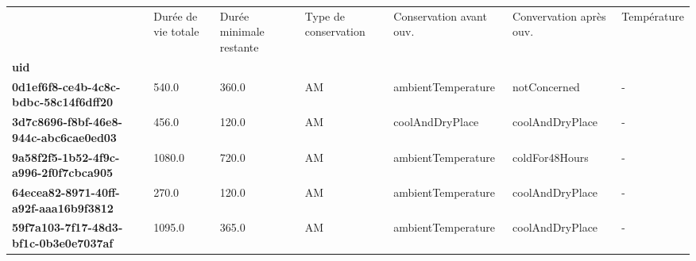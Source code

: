 \begin{tabularx}{\linewidth}{lXXXXXX}
\toprule
{} &  Durée de vie totale &  Durée minimale restante & Type de conservation & Conservation avant ouv. & Convervation après ouv. & Température \\
\textbf{uid                                 } &                      &                          &                      &                         &                         &             \\
\midrule
\textbf{0d1ef6f8-ce4b-4c8c-bdbc-58c14f6dff20} &                540.0 &                    360.0 &                   AM &      ambientTemperature &            notConcerned &           - \\
\textbf{3d7c8696-f8bf-46e8-944c-abc6cae0ed03} &                456.0 &                    120.0 &                   AM &         coolAndDryPlace &         coolAndDryPlace &           - \\
\textbf{9a58f2f5-1b52-4f9c-a996-2f0f7cbca905} &               1080.0 &                    720.0 &                   AM &      ambientTemperature &          coldFor48Hours &           - \\
\textbf{64ecea82-8971-40ff-a92f-aaa16b9f3812} &                270.0 &                    120.0 &                   AM &      ambientTemperature &         coolAndDryPlace &           - \\
\textbf{59f7a103-7f17-48d3-bf1c-0b3e0e7037af} &               1095.0 &                    365.0 &                   AM &      ambientTemperature &         coolAndDryPlace &           - \\
\bottomrule
\end{tabularx}
